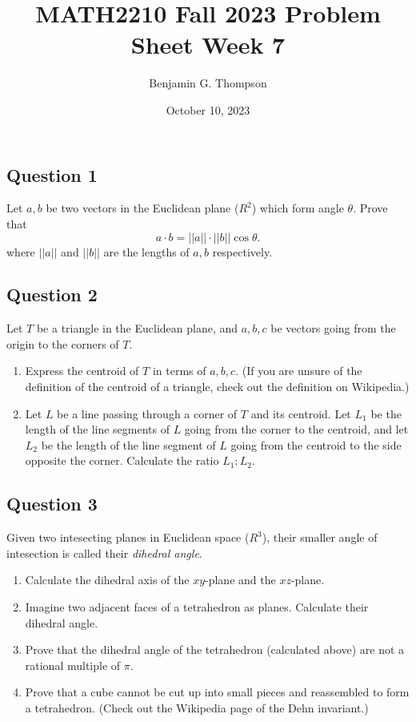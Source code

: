 \documentclass[12pt, a4paper]{article}
\title{MATH2210 Fall 2023 Problem Sheet Week 7}
\author{Benjamin G. Thompson}
\date{October 10, 2023}
\begin{document}
\subsection*{Question 1}
Let $a,b$ be two vectors in the Euclidean plane ($R^2$) which form angle $\theta$. Prove that
\[
a \cdot b = ||a|| \cdot ||b|| \cos \theta.
\]
where $||a||$ and $||b||$ are the lengths of $a,b$ respectively.

\subsection*{Question 2}
Let $T$ be a triangle in the Euclidean plane, and $a,b,c$ be vectors going from the origin to the corners of $T$.
\begin{enumerate}
\item Express the centroid of $T$ in terms of $a,b,c$. (If you are unsure of the definition of the centroid of a triangle, check out the definition on Wikipedia.)
\item Let $L$ be a line passing through a corner of $T$ and its centroid. Let $L_1$ be the length of the line segments of $L$ going from the corner to the centroid, and let $L_2$ be the length of the line segment of $L$ going from the centroid to the side opposite the corner. Calculate the ratio $L_1:L_2$.
\end{enumerate}

\subsection*{Question 3}
Given two intesecting planes in Euclidean space ($R^3$), their smaller angle of intesection is called their \emph{dihedral angle}.
\begin{enumerate}
\item Calculate the dihedral axis of the $xy$-plane and the $xz$-plane.
\item Imagine two adjacent faces of a tetrahedron as planes. Calculate their dihedral angle.
\item Prove that the dihedral angle of the tetrahedron (calculated above) are not a rational multiple of $\pi$.
\item Prove that a cube cannot be cut up into small pieces and reassembled to form a tetrahedron. (Check out the Wikipedia page of the Dehn invariant.)
\end{enumerate}
\end{document}
